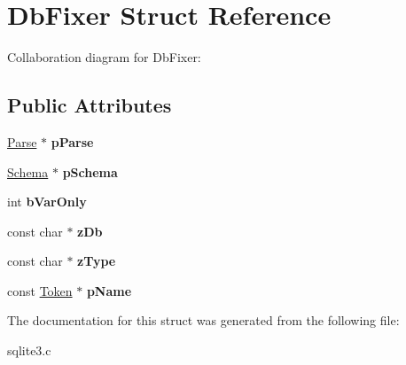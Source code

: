 \hypertarget{structDbFixer}{}\section{Db\+Fixer Struct Reference}
\label{structDbFixer}


Collaboration diagram for Db\+Fixer\+:
\subsection*{Public Attributes}
\begin{DoxyCompactItemize}
\item 
\hyperlink{structParse}{Parse} $\ast$ {\bfseries p\+Parse}\hypertarget{structDbFixer_ac5c9b8bca3b05a66faea11dd998bf6f6}{}\label{structDbFixer_ac5c9b8bca3b05a66faea11dd998bf6f6}

\item 
\hyperlink{structSchema}{Schema} $\ast$ {\bfseries p\+Schema}\hypertarget{structDbFixer_a302dd5335c8a982deda5bf04bae00363}{}\label{structDbFixer_a302dd5335c8a982deda5bf04bae00363}

\item 
int {\bfseries b\+Var\+Only}\hypertarget{structDbFixer_aebd8549176b84c8c71069ed4d77ad6af}{}\label{structDbFixer_aebd8549176b84c8c71069ed4d77ad6af}

\item 
const char $\ast$ {\bfseries z\+Db}\hypertarget{structDbFixer_aba91df5965a99915d9180805d02c4a7f}{}\label{structDbFixer_aba91df5965a99915d9180805d02c4a7f}

\item 
const char $\ast$ {\bfseries z\+Type}\hypertarget{structDbFixer_ae4748d9e97560b7b332527434408c2e8}{}\label{structDbFixer_ae4748d9e97560b7b332527434408c2e8}

\item 
const \hyperlink{structToken}{Token} $\ast$ {\bfseries p\+Name}\hypertarget{structDbFixer_aedee20e10de7337651b84656ee81b39c}{}\label{structDbFixer_aedee20e10de7337651b84656ee81b39c}

\end{DoxyCompactItemize}


The documentation for this struct was generated from the following file\+:\begin{DoxyCompactItemize}
\item 
sqlite3.\+c\end{DoxyCompactItemize}
